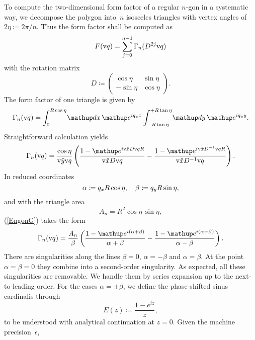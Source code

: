 To compute the two-dimensional form factor
of a regular $n$-gon in a systematic way,
we decompose the polygon into~$n$ isosceles triangles
with vertex angles of $2\eta\coloneqq2\pi/n$.
Thus the form factor shall be computed as
\begin{equation}
  F(\text{v}{q}) = \sum_{j=0}^{n-1} \Gamma_n(D^{2j}\text{v}{q})
\end{equation}
with the rotation matrix
\begin{equation}
  D\coloneqq\left(\begin{array}{ll}\cos\eta&\sin\eta\\
                          -\sin\eta&\cos\eta\end{array}\right).
\end{equation}
The form factor of one triangle is given by
\begin{equation}
  \Gamma_n(\q)
  =\int_0^{R\cos\eta}\!\d x\,\e^{iq_x x}
   \int_{-R\tan\eta}^{+R\tan\eta}\!\d y\,\e^{iq_yy}.
\end{equation}
Straightforward calculation yields
\begin{equation}\label{EngonG}
  \Gamma_n(\q)
  = \frac{\cos\eta}{\hy\q}\left(
    \frac{1-\e^{i\hx D\q R}}{\hx D\q}
   -\frac{1-\e^{i\hx D^{-1}\q R}}{\hx D^{-1}\q}\right).
\end{equation}
In reduced coordinates
\begin{equation}
    \alpha\coloneqq q_x R\cos\eta,\quad
    \beta\coloneqq q_y R\sin\eta,
\end{equation}
and with the triangle area
\begin{equation}
  A_n = R^2 \cos\eta\,\sin\eta,
\end{equation}
(\ref{EngonG}) takes the form
\begin{equation}\label{EngonG2}
  \Gamma_n(\q) =
    \frac{A_n}{\tqy}\left(
    \frac{1-\e^{i(\tqx+\tqy)}}{\tqx+\tqy}
   -\frac{1-\e^{i(\tqx-\tqy)}}{\tqx-\tqy}\right).
\end{equation}
There are singularities along the lines
$\beta=0$, $\alpha=-\beta$ and $\alpha=\beta$.
At the point $\alpha=\beta=0$ they combine into a second-order singularity.
As expected, all these singularities are removable.
We handle them by series expansion up to the next-to-leading order.
For the cases $\alpha=\pm\beta$,
we define the phase-shifted sinus cardinalis through
\begin{equation}
  E(z)\coloneqq\frac{1-e^{iz}}{z},
\end{equation}
to be understood with analytical continuation at $z=0$.
Given the machine precision~$\epsilon$,
